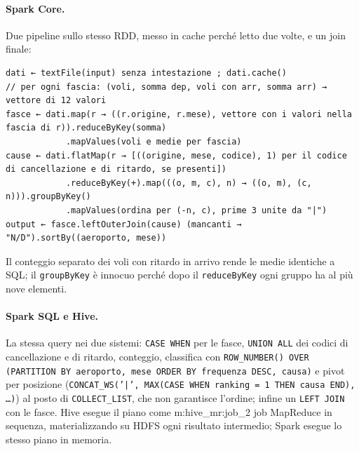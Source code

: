 \documentclass[11pt,a4paper]{article}
\newcommand{\M}[1]{\csname m:#1\endcsname}
\newcommand{\code}[1]{\texttt{#1}}
\begin{document}
\paragraph{Spark Core.} Due pipeline sullo stesso RDD, messo in cache perché letto due volte, e un join finale:
\begin{lstlisting}[language=pseudo]
dati ← textFile(input) senza intestazione ; dati.cache()
// per ogni fascia: (voli, somma dep, voli con arr, somma arr) → vettore di 12 valori
fasce ← dati.map(r → ((r.origine, r.mese), vettore con i valori nella fascia di r)).reduceByKey(somma)
            .mapValues(voli e medie per fascia)
cause ← dati.flatMap(r → [((origine, mese, codice), 1) per il codice di cancellazione e di ritardo, se presenti])
            .reduceByKey(+).map(((o, m, c), n) → ((o, m), (c, n))).groupByKey()
            .mapValues(ordina per (-n, c), prime 3 unite da "|")
output ← fasce.leftOuterJoin(cause) (mancanti → "N/D").sortBy((aeroporto, mese))
\end{lstlisting}
Il conteggio separato dei voli con ritardo in arrivo rende le medie identiche a SQL; il \code{groupByKey} è innocuo
perché dopo il \code{reduceByKey} ogni gruppo ha al più nove elementi.

\paragraph{Spark SQL e Hive.} La stessa query nei due sistemi: \code{CASE WHEN} per le fasce, \code{UNION ALL} dei
codici di cancellazione e di ritardo, conteggio, classifica con
\code{ROW\_NUMBER() OVER (PARTITION BY aeroporto, mese ORDER BY frequenza DESC, causa)} e pivot per posizione
(\code{CONCAT\_WS('|', MAX(CASE WHEN ranking = 1 THEN causa END), \dots)}) al posto di \code{COLLECT\_LIST}, che non
garantisce l'ordine; infine un \code{LEFT JOIN} con le fasce. Hive esegue il piano come \M{hive_mr:job_2} job
MapReduce in sequenza, materializzando su HDFS ogni risultato intermedio; Spark esegue lo stesso piano in memoria.

\begin{table}[H]
\centering\scriptsize\setlength{\tabcolsep}{2.5pt}

\caption{Job 2: prime 10 righe sul dataset completo (\csname righe_output:job_2\endcsname{} righe), identiche per le tre
tecnologie. B, M, A: fasce basso, medio, alto; ``dep'' e ``arr'': ritardi medi in minuti. Cause: LATE aeromobile in
ritardo, CAR compagnia, NAS sistema aereo nazionale, WEA meteo, SEC sicurezza; il prefisso C: indica una
cancellazione (\code{CANC\_*}), altrimenti è una causa di ritardo (\code{DELAY\_*}).}
\label{tab:righe2}
\end{table}
\end{document}
